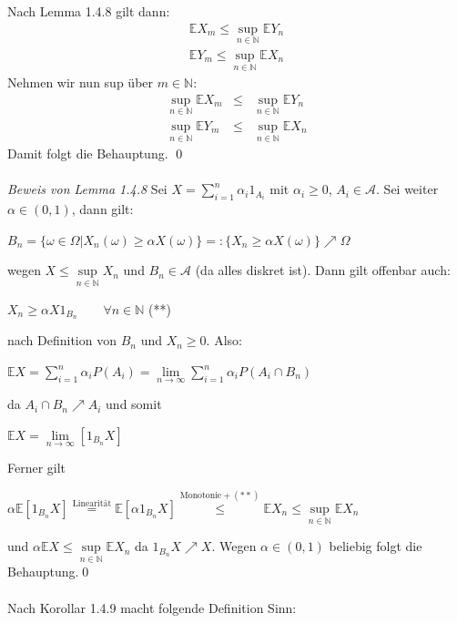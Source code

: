 \documentclass[10pt,a4paper]{report}
\numberwithin{equation}{section}
\numberwithin{figure}{section}
\theoremstyle{plain}
\theoremstyle{definition}
\theoremstyle{plain}
\theoremstyle{definition}
\theoremstyle{remark}
\theoremstyle{plain}
\theoremstyle{plain}
\theoremstyle{plain}
\newcommand{\1}{ \mathbb{1} } %
\begin{document}
Nach Lemma 1.4.8 gilt dann:
\begin{eqnarray*}
\mathbb{E}X_m\leq \sup\limits_{n\in \mathbb{N}}\mathbb{E} Y_n
\end{eqnarray*}
\begin{eqnarray*}
\mathbb{E}Y_m\leq \sup\limits_{n\in \mathbb{N}}\mathbb{E} X_n
\end{eqnarray*}
Nehmen wir nun sup über $m \in \mathbb{N}$:
\begin{eqnarray*}
\sup\limits_{n\in \mathbb{N}}\mathbb{E}X_m &\leq &\sup\limits_{n\in \mathbb{N}}\mathbb{E}Y_n\\
\sup\limits_{n\in \mathbb{N}}\mathbb{E}Y_m &\leq &\sup\limits_{n\in \mathbb{N}}\mathbb{E}X_n
\end{eqnarray*}
Damit folgt die Behauptung. \qed\\\\
\textit{Beweis von Lemma 1.4.8}
Sei $X=\sum\limits_{i=1}^n\alpha_i1_{A_i}$ mit $\alpha_i \geq 0$, $A_i \in \mathcal{A}$. Sei weiter $\alpha \in (0,1)$, dann gilt:
\begin{center}
$B_n=\{\omega \in \Omega|X_n(\omega)\geq \alpha X(\omega)\}=:\{X_n\geq \alpha X(\omega)\}\nearrow \Omega$
\end{center}
wegen  $X \leq \sup\limits_{n\in \mathbb{N}} X_n$ und $B_n \in \mathcal{A}$ (da alles diskret ist). Dann gilt offenbar auch:
\begin{center}
$X_n \geq \alpha X1_{B_n} \qquad \forall n \in \mathbb{N}$ (**)
\end{center}
nach Definition von $B_n$ und $X_n\geq 0$. Also:
\begin{center}
$\mathbb{E}X=\sum\limits_{i=1}^n\alpha_i P(A_i)=\lim\limits_{n \to \infty} \sum\limits_{i=1}^n\alpha_i P(A_i\cap B_n)$
\end{center}
da $A_i\cap B_n \nearrow A_i$ und somit
\begin{center}
$\mathbb{E}X=\lim\limits_{n \to \infty}[1_{B_n}X]$
\end{center}
Ferner gilt
\begin{center}
$\alpha \mathbb{E}[1_{B_n}X]\overset{\text{Linearität}}{=}\mathbb{E}[\alpha 1_{B_n}X]\overset{\text{Monotonie}+(**)}{\leq}\mathbb{E}X_n\leq\sup\limits_{n\in \mathbb{N}}\mathbb{E}X_n$
\end{center}
und $\alpha \mathbb{E}X\leq \sup\limits_{n\in \mathbb{N}}\mathbb{E}X_n$ da $1_{B_n}X\nearrow X$. Wegen $\alpha \in (0,1)$ beliebig folgt die Behauptung.\qed\\\\
Nach Korollar 1.4.9 macht folgende Definition Sinn:\\\\
\end{document}
